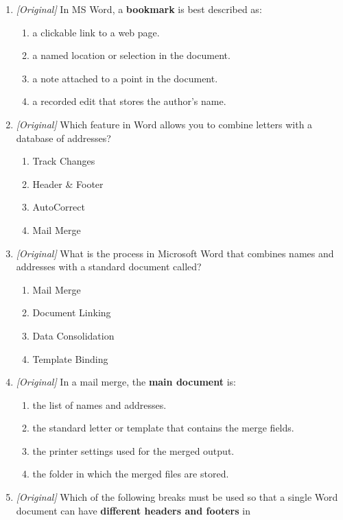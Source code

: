 \documentclass[11pt]{article}
\begin{document}
\begin{enumerate}[label=\textbf{Q\arabic*.}, leftmargin=*]
\begin{enumerate}[label=\Alph*.]
  \end{enumerate}
\item \textit{[Original]} In MS Word, a \textbf{bookmark} is best described as:
  \begin{enumerate}[label=\Alph*.]
    \item a clickable link to a web page.
    \item a named location or selection in the document.
    \item a note attached to a point in the document.
    \item a recorded edit that stores the author's name.
  \end{enumerate}
\item \textit{[Original]} Which feature in Word allows
you to combine letters with a database of addresses?
  \begin{enumerate}[label=\Alph*.]
    \item Track Changes
    \item Header \& Footer
    \item AutoCorrect
    \item Mail Merge
  \end{enumerate}
\item \textit{[Original]} What is the process in Microsoft
Word that combines names and addresses with a standard document called?
  \begin{enumerate}[label=\Alph*.]
    \item Mail Merge
    \item Document Linking
    \item Data Consolidation
    \item Template Binding
  \end{enumerate}
\item \textit{[Original]} In a mail merge, the \textbf{main document} is:
  \begin{enumerate}[label=\Alph*.]
    \item the list of names and addresses.
    \item the standard letter or template that contains the merge fields.
    \item the printer settings used for the merged output.
    \item the folder in which the merged files are stored.
  \end{enumerate}
\item \textit{[Original]} Which of the following breaks must be used so that a
  single Word document can have \textbf{different headers and footers} in

\end{enumerate}
\end{document}
